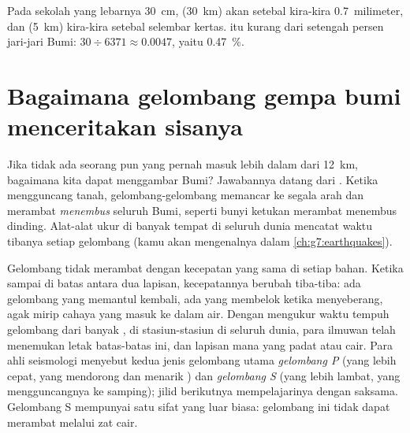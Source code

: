 \begin{remark}\label{rem:g6:inside-the-earth:thin-crust}
Pada  sekolah yang lebarnya 30~cm,   (30~km) akan
setebal kira-kira 0.7~milimeter, dan   (5~km) kira-kira setebal
selembar kertas.  itu kurang dari setengah persen jari-jari Bumi:
$30 \div 6371 \approx 0.0047$, yaitu 0.47~\%.
\end{remark}

\section{Bagaimana gelombang gempa bumi menceritakan sisanya}\label{sec:g6:inside-the-earth:waves}

Jika tidak ada seorang pun yang pernah masuk lebih dalam dari 12~km,
bagaimana kita dapat menggambar  Bumi? Jawabannya datang dari . Ketika  mengguncang tanah, gelombang-gelombang memancar ke
segala arah dan merambat \emph{menembus} seluruh Bumi, seperti bunyi ketukan
merambat menembus dinding. Alat-alat ukur di banyak tempat di seluruh dunia
mencatat waktu tibanya setiap gelombang (kamu akan mengenalnya dalam
\cref{ch:g7:earthquakes}).

Gelombang tidak merambat dengan kecepatan yang sama di setiap bahan. Ketika
sampai di batas antara dua lapisan, kecepatannya berubah tiba-tiba: ada
gelombang yang memantul kembali, ada yang membelok ketika menyeberang, agak
mirip cahaya yang masuk ke dalam air. Dengan mengukur waktu tempuh gelombang
dari banyak , di stasiun-stasiun di seluruh dunia, para ilmuwan
telah menemukan letak batas-batas ini, dan lapisan mana yang padat atau
cair. Para ahli seismologi menyebut kedua jenis gelombang utama
\emph{gelombang P} (yang lebih cepat, yang mendorong dan menarik ) dan
\emph{gelombang S} (yang lebih lambat, yang mengguncangnya ke samping); jilid
berikutnya mempelajarinya dengan saksama. Gelombang S mempunyai satu sifat
yang luar biasa: gelombang ini tidak dapat merambat melalui zat cair.

